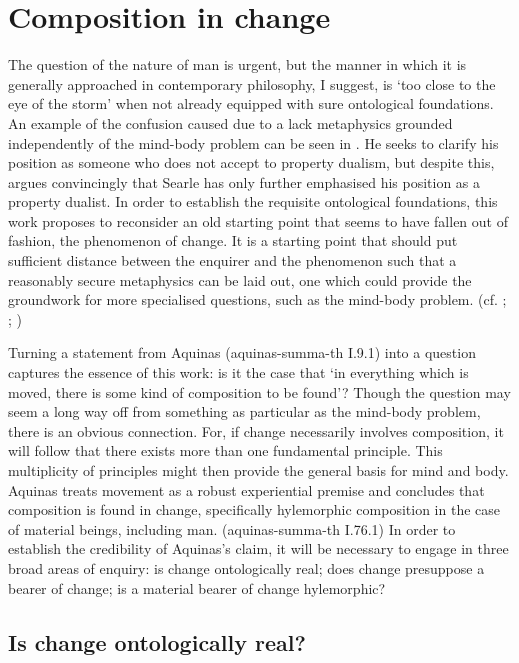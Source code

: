 \section{Composition in change}

The question of the nature of man is urgent, but the manner in which it is generally approached in contemporary philosophy, I suggest, is `too close to the eye of the storm' when not already equipped with sure ontological foundations. An example of the confusion caused due to a lack metaphysics grounded independently of the mind-body problem can be seen in \textcite[][]{Searle2002-SEAWIA}. He seeks to clarify his position as someone who does not accept to property dualism, but despite this, \textcite[][]{feser-2004-searle} argues convincingly that Searle has only further emphasised his position as a property dualist.
In order to establish the requisite ontological foundations, this work proposes to reconsider an old starting point that seems to have fallen out of fashion, the phenomenon of change. It is a starting point that should put sufficient distance between the enquirer and the phenomenon such that a reasonably secure metaphysics can be laid out, one which could provide the groundwork for more specialised questions, such as the mind-body problem.
(cf. \cite[][]{sep-change}; \cite[][]{sep-temporal-parts}; \cite[][17-68]{feser2017five})

Turning a statement from Aquinas (\acrshort{aquinas-summa-th} I.9.1) into a question captures the essence of this work: is it the case that `in everything which is moved, there is some kind of composition to be found'?
Though the question may seem a long way off from something as particular as the mind-body problem, there is an obvious connection.
For, if change necessarily involves composition, it will follow that there exists more than one fundamental principle. This multiplicity of principles might then provide the general basis for mind and body.
Aquinas treats movement as a robust experiential premise and concludes that composition is found in change, specifically hylemorphic composition in the case of material beings, including man.
(\acrshort{aquinas-summa-th} I.76.1)
In order to establish the credibility of Aquinas's claim, it will be necessary to engage in three broad areas of enquiry:
is change ontologically real; does change presuppose a bearer of change; is a material bearer of change hylemorphic?

\subsection{Is change ontologically real?}

